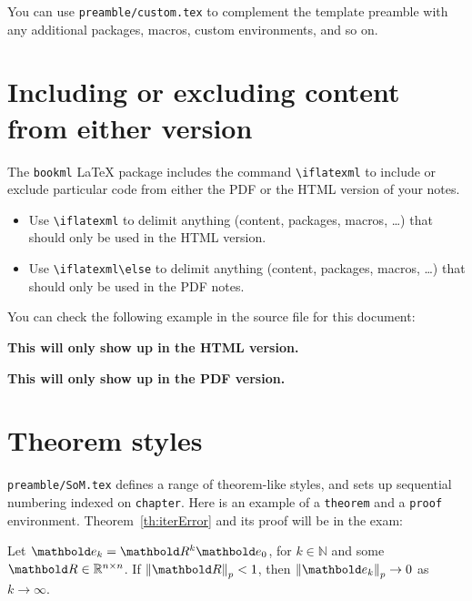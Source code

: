 You can use \verb|preamble/custom.tex| to complement the template preamble with any additional packages, macros, custom environments, and so on.


\section{Including or excluding content from either version}
\label{demo:ifpdf}

The \verb|bookml| \LaTeX{} package includes the command \verb|\iflatexml|  to include or exclude particular code from either the PDF or the HTML version of your notes.

\begin{itemize}
    \item Use \verb|\iflatexml| to delimit anything (content, packages, macros, \ldots) that should only be used in the HTML version.
    \item Use \verb|\iflatexml\else| to delimit anything (content, packages, macros, \ldots) that should only be used in the PDF notes.
\end{itemize}

You can check the following example in the source file for this document:



\iflatexml
  \textbf{This will only show up in the HTML version.}
\fi

\iflatexml
\else
  \textbf{This will only show up in the PDF version.}
\fi



\section{Theorem styles}
\label{demo:thm}

\verb|preamble/SoM.tex| defines a range of theorem-like styles, and sets up sequential numbering indexed on \verb|chapter|. Here is an example of a \verb|theorem| and a \verb|proof| environment.
Theorem~\ref{th:iterError} and its proof will be in the exam:

\begin{theorem}
  \label{th:iterError}
  Let $\vect{e}_k = \mat{R}^k \vect{e}_0$, for $k\in \mathbb{N}$ and some $\mat{R}\in \R^{n\times n}$. If $\norm{\mat{R}}_p < 1$, then \mbox{$\norm{\vect{e}_k}_p \to 0$} as $k \to \infty$.
\end{theorem}

